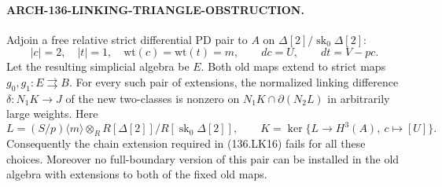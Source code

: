 \paragraph{ARCH-136-LINKING-TRIANGLE-OBSTRUCTION.}
Adjoin a free relative strict differential PD pair to \(A\)
on \(\Delta[2]/\operatorname{sk}_0\Delta[2]\):
\[
       |c|=2,\quad |t|=1,\quad \mathrm{wt}(c)=\mathrm{wt}(t)=m,
       \qquad dc=U,\qquad dt=V-pc.
                                                               \tag{136.LT3}
\]
Let the resulting simplicial algebra be \(E\).  Both old maps
extend to strict maps \(g_0,g_1:E\rightrightarrows B\).
For every such pair of extensions, the normalized linking
difference \(\delta:N_1K\to J\) of the new two-classes
is nonzero on \(N_1K\cap\partial(N_2L)\) in arbitrarily
large weights.  Here
\[
 L=(S/p)\langle m\rangle\otimes_R
       R[\Delta[2]]/R[\operatorname{sk}_0\Delta[2]],
 \qquad K=\ker\{L\longrightarrow H^3(A),\ c\longmapsto[U]\}.
                                                               \tag{136.LT4}
\]
Consequently the chain extension required in (136.LK16) fails
for all these choices.  Moreover no full-boundary version of
this pair can be installed in the old algebra with extensions
to both of the fixed old maps.

